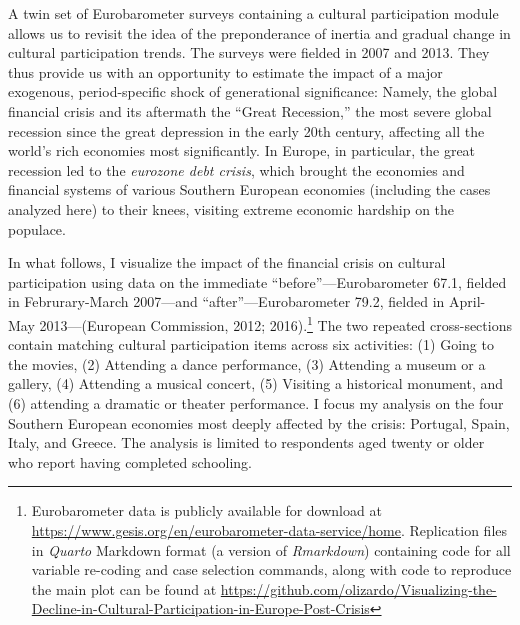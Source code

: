 \documentclass{article}
\begin{document}
A twin set of Eurobarometer surveys containing a cultural participation module allows us to revisit the idea of the preponderance of inertia and gradual change in cultural participation trends. The surveys were fielded in 2007 and 2013. They thus provide us with an opportunity to estimate the impact of a major exogenous, period-specific shock of generational significance: Namely, the global financial crisis and its aftermath the ``Great Recession,'' the most severe global recession since the great depression in the early 20th century,  affecting all the world's rich economies most significantly. In Europe, in particular, the great recession led to the {\em eurozone debt crisis}, which brought the economies and financial systems of various Southern European economies (including the cases analyzed here) to their knees, visiting extreme economic hardship on the populace.

In what follows, I visualize the impact of the financial crisis on cultural participation using data on the immediate ``before''---Eurobarometer 67.1, fielded in Februrary-March 2007---and ``after''---Eurobarometer 79.2, fielded in April-May 2013---(European Commission, 2012; 2016).\footnote{Eurobarometer data is publicly available for download at \href{https://www.gesis.org/en/eurobarometer-data-service/home}{https://www.gesis.org/en/eurobarometer-data-service/home}. Replication files in \textit{Quarto} Markdown format (a version of \textit{Rmarkdown}) containing code for all variable re-coding and case selection commands, along with code to reproduce the main plot can be found at \href{https://github.com/olizardo/Visualizing-the-Decline-in-Cultural-Participation-in-Europe-Post-Crisis}{https://github.com/olizardo/Visualizing-the-Decline-in-Cultural-Participation-in-Europe-Post-Crisis}} The two repeated cross-sections contain matching cultural participation items across six activities: (1) Going to the movies, (2) Attending a dance performance, (3) Attending a museum or a gallery, (4) Attending a musical concert, (5) Visiting a historical monument, and (6) attending a dramatic or theater performance. I focus my analysis on the four Southern European economies most deeply affected by the crisis: Portugal, Spain, Italy, and Greece. The analysis is limited to respondents aged twenty or older who report having completed schooling. 
\end{document}
